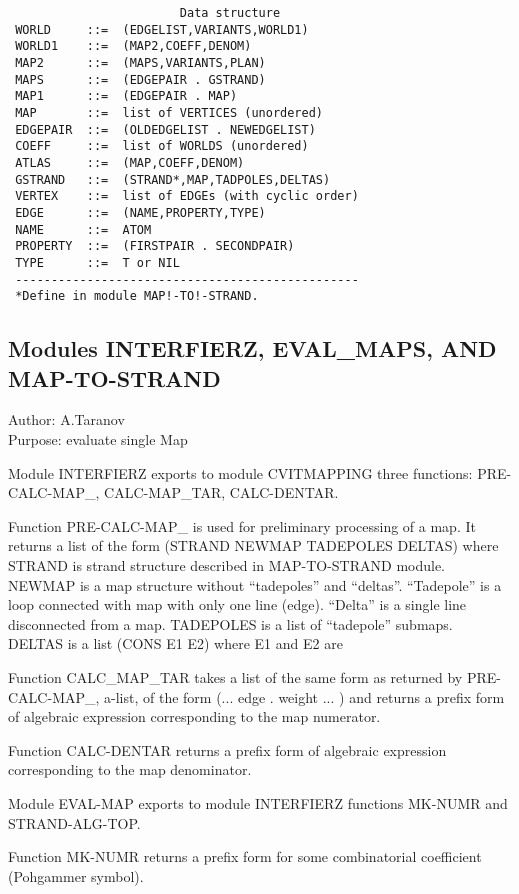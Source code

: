 \begin{verbatim}
                        Data structure
 WORLD     ::=  (EDGELIST,VARIANTS,WORLD1)
 WORLD1    ::=  (MAP2,COEFF,DENOM)
 MAP2      ::=  (MAPS,VARIANTS,PLAN)
 MAPS      ::=  (EDGEPAIR . GSTRAND)
 MAP1      ::=  (EDGEPAIR . MAP)
 MAP       ::=  list of VERTICES (unordered)
 EDGEPAIR  ::=  (OLDEDGELIST . NEWEDGELIST)
 COEFF     ::=  list of WORLDS (unordered)
 ATLAS     ::=  (MAP,COEFF,DENOM)
 GSTRAND   ::=  (STRAND*,MAP,TADPOLES,DELTAS)
 VERTEX    ::=  list of EDGEs (with cyclic order)
 EDGE      ::=  (NAME,PROPERTY,TYPE)
 NAME      ::=  ATOM
 PROPERTY  ::=  (FIRSTPAIR . SECONDPAIR)
 TYPE      ::=  T or NIL
 ------------------------------------------------
 *Define in module MAP!-TO!-STRAND.

\end{verbatim}

\subsection*{Modules INTERFIERZ, EVAL\_MAPS, AND MAP-TO-STRAND}

\begin{center}
Author: A.Taranov \\
Purpose: evaluate single Map
\end{center}

Module INTERFIERZ exports to module CVITMAPPING three functions:
PRE-CALC-MAP\_, CALC-MAP\_TAR, CALC-DENTAR.

Function PRE-CALC-MAP\_ is used for preliminary processing of a map. It
returns a list of the form (STRAND NEWMAP TADEPOLES DELTAS) where
STRAND is strand structure described in MAP-TO-STRAND module.  NEWMAP
is a map structure without ``tadepoles'' and ``deltas''.  ``Tadepole'' is a
loop connected with map with only one line (edge). ``Delta'' is a single
line disconnected from a map.  TADEPOLES is a list of ``tadepole''
submaps.  DELTAS is a list (CONS E1 E2) where E1 and E2 are

Function CALC\_MAP\_TAR takes a list of the same form as returned by
PRE-CALC-MAP\_, a-list, of the form (...  edge . weight ...  )  and
returns a prefix form of algebraic expression corresponding to the map
numerator.

Function CALC-DENTAR returns a prefix form of algebraic expression
corresponding to the map denominator.

Module EVAL-MAP exports to module INTERFIERZ functions MK-NUMR and
STRAND-ALG-TOP.

Function MK-NUMR returns a prefix form for some combinatorial
coefficient (Pohgammer symbol).

